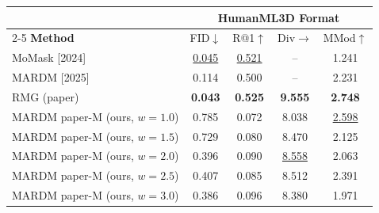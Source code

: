 \begin{tabular}{l|cccc}
\hline\hline
 & \multicolumn{4}{c}{\textbf{HumanML3D Format}} \\
\cline{2-5}
\textbf{Method} & FID$\downarrow$ & R@1$\uparrow$ & Div$\rightarrow$ & MMod$\uparrow$ \\
\hline
MoMask [2024] & \underline{0.045} & \underline{0.521} & -- & 1.241 \\
MARDM [2025] & 0.114 & 0.500 & -- & 2.231 \\
RMG (paper) & \textbf{0.043} & \textbf{0.525} & \textbf{9.555} & \textbf{2.748} \\
\hline
MARDM paper-M (ours, $w=1.0$) & 0.785 & 0.072 & 8.038 & \underline{2.598} \\
MARDM paper-M (ours, $w=1.5$) & 0.729 & 0.080 & 8.470 & 2.125 \\
MARDM paper-M (ours, $w=2.0$) & 0.396 & 0.090 & \underline{8.558} & 2.063 \\
MARDM paper-M (ours, $w=2.5$) & 0.407 & 0.085 & 8.512 & 2.391 \\
MARDM paper-M (ours, $w=3.0$) & 0.386 & 0.096 & 8.380 & 1.971 \\
\hline\hline
\end{tabular}
